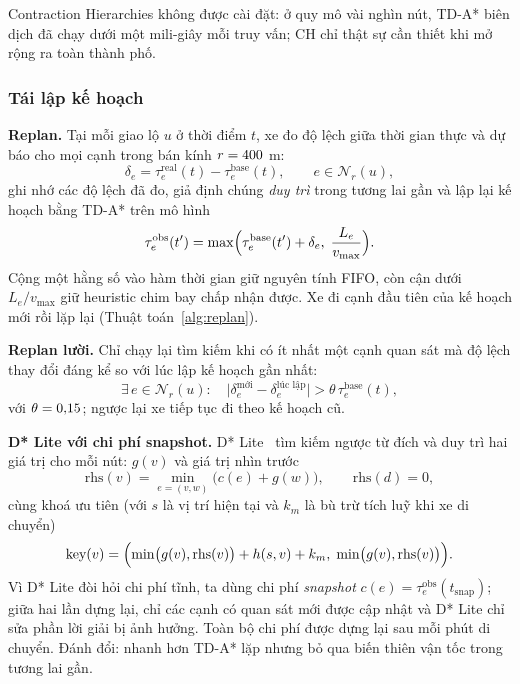 Contraction Hierarchies không được cài đặt: ở quy mô vài nghìn nút, TD-A* biên dịch đã chạy dưới một mili-giây mỗi truy
vấn; CH chỉ thật sự cần thiết khi mở rộng ra toàn thành phố.

\subsubsection{Tái lập kế hoạch}\label{sec:method:replan}

\textbf{Replan.} Tại mỗi giao lộ $u$ ở thời điểm $t$, xe đo độ lệch giữa thời gian thực và dự báo cho mọi cạnh trong bán
kính $r=400$ m:
\begin{equation}
\delta_e = \tau^{\text{real}}_e(t) - \tau^{\text{base}}_e(t), \qquad e\in\mathcal{N}_r(u),
\label{eq:delta}
\end{equation}
ghi nhớ các độ lệch đã đo, giả định chúng \emph{duy trì} trong tương lai gần và lập lại kế hoạch bằng TD-A* trên mô hình
\begin{equation}
\tau^{\text{obs}}_e(t') = \max\Bigl(\tau^{\text{base}}_e(t') + \delta_e,\; \frac{L_e}{v_{\max}}\Bigr).
\label{eq:tau-obs}
\end{equation}
Cộng một hằng số vào hàm thời gian giữ nguyên tính FIFO, còn cận dưới $L_e/v_{\max}$ giữ heuristic chim bay chấp nhận
được. Xe đi cạnh đầu tiên của kế hoạch mới rồi lặp lại (Thuật toán~\ref{alg:replan}).

\textbf{Replan lười.} Chỉ chạy lại tìm kiếm khi có ít nhất một cạnh quan sát mà độ lệch thay đổi đáng kể so với lúc lập
kế hoạch gần nhất:
\begin{equation}
\exists\, e\in\mathcal{N}_r(u):\quad \bigl|\delta_e^{\text{mới}} - \delta_e^{\text{lúc lập}}\bigr| > \theta\,\tau^{\text{base}}_e(t),
\label{eq:lazy}
\end{equation}
với $\theta=0{,}15$; ngược lại xe tiếp tục đi theo kế hoạch cũ.

\textbf{D* Lite với chi phí snapshot.} D* Lite~\cite{koenig2002} tìm kiếm ngược từ đích và duy trì hai giá trị cho mỗi nút:
$g(v)$ và giá trị nhìn trước
\begin{equation}
\text{rhs}(v) = \min_{e=(v,w)} \bigl(c(e) + g(w)\bigr), \qquad \text{rhs}(d)=0,
\label{eq:rhs}
\end{equation}
cùng khoá ưu tiên (với $s$ là vị trí hiện tại và $k_m$ là bù trừ tích luỹ khi xe di chuyển)
\begin{equation}
\text{key}(v) = \Bigl(\min\bigl(g(v),\text{rhs}(v)\bigr) + h(s,v) + k_m,\; \min\bigl(g(v),\text{rhs}(v)\bigr)\Bigr).
\label{eq:dstar-key}
\end{equation}
Vì D* Lite đòi hỏi chi phí tĩnh, ta dùng chi phí \emph{snapshot} $c(e)=\tau^{\text{obs}}_e(t_{\text{snap}})$; giữa hai lần
dựng lại, chỉ các cạnh có quan sát mới được cập nhật và D* Lite chỉ sửa phần lời giải bị ảnh hưởng. Toàn bộ chi phí được
dựng lại sau mỗi \DstarRefresh{} phút di chuyển. Đánh đổi: nhanh hơn TD-A* lặp nhưng bỏ qua biến thiên vận tốc trong
tương lai gần.

